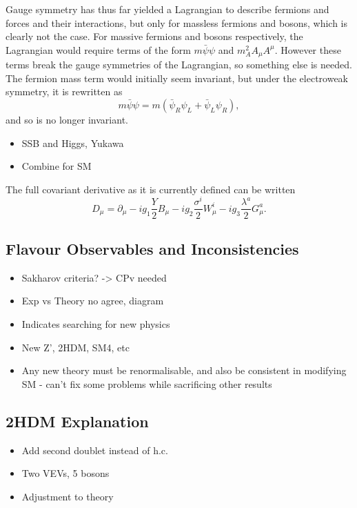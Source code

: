 \documentclass[a4paper,12pt]{article}
\begin{document}
Gauge symmetry has thus far yielded a Lagrangian to describe fermions and forces and their interactions, but only for massless fermions and bosons, which is clearly not the case. 
For massive fermions and bosons respectively, the Lagrangian would require terms of the form $m\bar{\psi}\psi$ and $m_A^2A_\mu A^\mu$.
However these terms break the gauge symmetries of the Lagrangian, so something else is needed.
The fermion mass term would initially seem invariant, but under the electroweak symmetry, it is rewritten as
\begin{equation}
    \label{eq:mass}
    m\bar{\psi}\psi = m(\bar{\psi}_R\psi_L+\bar{\psi}_L\psi_R),
\end{equation}
and so is no longer invariant.
\begin{itemize}
    \item SSB and Higgs, Yukawa
    \item Combine for SM
\end{itemize}
The full covariant derivative as it is currently defined can be written
\begin{equation}
    \label{eq:covar}
    D_\mu = \partial_\mu - ig_1\frac{Y}{2}B_\mu - ig_2\frac{\sigma^i}{2}W^i_\mu - ig_3\frac{\lambda^a}{2}G^a_\mu.
\end{equation}

\subsection{Flavour Observables and Inconsistencies}
\label{subsec:flavobs}
\begin{itemize}
    \item Sakharov criteria? -> CPv needed
    \item Exp vs Theory no agree, diagram
    \item Indicates searching for new physics
    \item New Z', 2HDM, SM4, etc
    \item Any new theory must be renormalisable, and also be consistent in modifying SM - can't fix some problems while sacrificing other results
\end{itemize}

\subsection{2HDM Explanation}
\begin{itemize}
    \item Add second doublet instead of h.c.
    \item Two VEVs, 5 bosons
    \item Adjustment to theory
\end{itemize}
\end{document}
